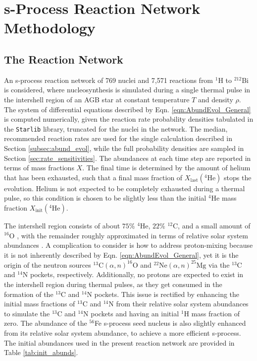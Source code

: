 \section{s-Process Reaction Network Methodology} \label{sec:network_method}

\subsection{The Reaction Network} \label{subsec:the_reaction_network}


An s-process reaction network of 769 nuclei and 7,571 reactions from $^{1}$H to $^{212}$Bi is considered, where nucleosynthesis is simulated during a single thermal pulse in the intershell region of an AGB star at constant temperature $T$ and density $\rho$. The system of differential equations described by Eqn. \ref{eqn:AbundEvol_General} is computed numerically, given the reaction rate probability densities tabulated in the \texttt{Starlib} \cite{Sallaska2013} library, truncated for the nuclei in the network. The median, recommended reaction rates are used for the single calculation described in Section \ref{subsec:abund_evol}, while the full probability densities are sampled in Section \ref{sec:rate_sensitivities}. The abundances at each time step are reported in terms of mass fractions $X$. The final time is determined by the amount of helium that has been exhausted, such that a final mass fraction of $X_{\mathrm{last}}(^{4}\mathrm{He})$ stops the evolution. Helium is not expected to be completely exhausted during a thermal pulse, so this condition is chosen to be slightly less than the initial $^{4}$He mass fraction $X_{\mathrm{init}}(^{4}\mathrm{He})$.

The intershell region consists of about $75\%$ $^{4}$He, $22\%$ $^{12}$C, and a small amount of $^{16}$O \cite{Habing2004}, with the remainder roughly approximated in terms of relative solar system abundances \cite{Lodders2009}. A complication to consider is how to address proton-mixing because it is not inherently described by Eqn. \ref{eqn:AbundEvol_General}, yet it is the origin of the neutron sources $^{13}\mathrm{C}(\alpha,n)^{16}\mathrm{O}$ and $^{22}\mathrm{Ne}(\alpha,n)^{25}\mathrm{Mg}$ via the $^{13}$C and $^{14}$N pockets, respectively. Additionally, no protons are expected to exist in the intershell region during thermal pulses, as they get consumed in the formation of the $^{13}$C and $^{14}$N pockets. This issue is rectified by enhancing the initial mass fractions of $^{13}$C and $^{14}$N from their relative solar system abundances to simulate the $^{13}$C and $^{14}$N pockets and having an initial $^{1}$H mass fraction of zero. The abundance of the $^{56}$Fe s-process seed nucleus is also slightly enhanced from its relative solar system abundance, to achieve a more efficient s-process. The initial abundances used in the present reaction network are provided in Table \ref{tab:init_abunds}.

